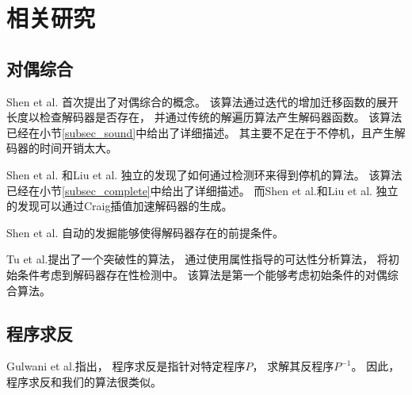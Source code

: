 \chapter{相关研究}
\label{chap:2}
%
%

\section{对偶综合}\label{subsec_compsyn_relat}
Shen et al. 首次提出了对偶综合的概念。
该算法通过迭代的增加迁移函数的展开长度以检查解码器是否存在，
并通过传统的解遍历算法产生解码器函数。
该算法已经在小节\ref{subsec_sound}中给出了详细描述。
其主要不足在于不停机，且产生解码器的时间开销太大。

Shen et al. 和Liu et al. 独立的发现了如何通过检测环来得到停机的算法。
该算法已经在小节\ref{subsec_complete}中给出了详细描述。
而Shen et al.和Liu et al. 独立的发现可以通过Craig插值加速解码器的生成。

Shen et al.  自动的发掘能够使得解码器存在的前提条件。

Tu et al.提出了一个突破性的算法，
通过使用属性指导的可达性分析算法，
将初始条件考虑到解码器存在性检测中。
该算法是第一个能够考虑初始条件的对偶综合算法。

\section{程序求反}\label{subsec_proinv}
Gulwani et al.指出，
程序求反是指针对特定程序$P$，
求解其反程序$P^{-1}$。
因此，
程序求反和我们的算法很类似。

